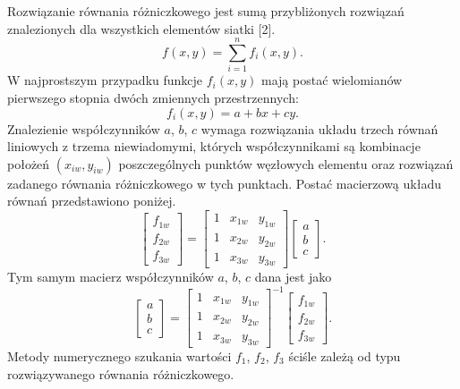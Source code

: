 \documentclass[12pt,a4paper]{article}
\begin{document}
Rozwiązanie równania różniczkowego jest sumą przybliżonych rozwiązań znalezionych dla
wszystkich elementów siatki [2].
\begin{equation}
f(x,y)=\sum_{i=1}^{n}f_i(x,y). \tag{2.11}
\end{equation}
W najprostszym przypadku funkcje $f_i(x,y)$ mają postać wielomianów pierwszego stopnia dwóch
zmiennych przestrzennych:
\begin{equation}
f_i(x,y)=a+bx+cy. \tag{2.12}
\end{equation}
Znalezienie współczynników $a$, $b$, $c$ wymaga rozwiązania układu trzech równań liniowych z trzema
niewiadomymi, których współczynnikami są kombinacje położeń $(x_{iw},y_{iw})$ poszczególnych punktów
węzłowych elementu oraz rozwiązań zadanego równania różniczkowego w tych punktach. Postać
macierzową układu równań przedstawiono poniżej.
\begin{equation}
\begin{bmatrix}
f_{1w}\\ f_{2w}\\ f_{3w}
\end{bmatrix}
=
\begin{bmatrix}
1&x_{1w}&y_{1w}\\
1&x_{2w}&y_{2w}\\
1&x_{3w}&y_{3w}
\end{bmatrix}
\begin{bmatrix}
a\\ b\\ c
\end{bmatrix}. \tag{2.13}
\end{equation}
Tym samym macierz współczynników $a$, $b$, $c$ dana jest jako
\begin{equation}
\begin{bmatrix}
a\\ b\\ c
\end{bmatrix}
=
\begin{bmatrix}
1&x_{1w}&y_{1w}\\
1&x_{2w}&y_{2w}\\
1&x_{3w}&y_{3w}
\end{bmatrix}^{-1}
\begin{bmatrix}
f_{1w}\\ f_{2w}\\ f_{3w}
\end{bmatrix}. \tag{2.14}
\end{equation}
Metody numerycznego szukania wartości $f_1$, $f_2$, $f_3$ ściśle zależą od typu rozwiązywanego równania
różniczkowego.
\end{document}
